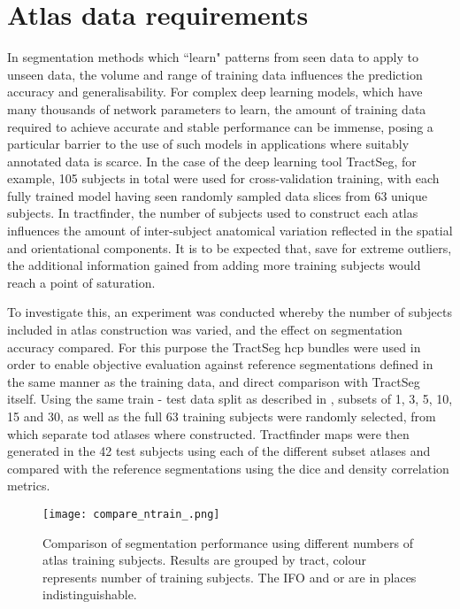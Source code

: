 \section{Atlas data requirements}\label{sec:ntrain}

In segmentation methods which ``learn" patterns from seen data to apply to unseen data, the volume and range of training data influences the prediction accuracy and generalisability.
For complex deep learning models, which have many thousands of network parameters to learn, the amount of training data required to achieve accurate and stable performance can be immense, posing a particular barrier to the use of such models in applications where suitably annotated data is scarce.
In the case of the deep learning tool TractSeg\autocite{Wasserthal2018}, for example, 105 subjects in total were used for cross-validation training, with each fully trained model having seen randomly sampled data slices from 63 unique subjects.
In tractfinder, the number of subjects used to construct each atlas influences the amount of inter-subject anatomical variation reflected in the spatial and orientational components.
It is to be expected that, save for extreme outliers, the additional information gained from adding more training subjects would reach a point of saturation.

To investigate this, an experiment was conducted whereby the number of subjects included in atlas construction was varied, and the effect on segmentation accuracy compared.
For this purpose the TractSeg \gls{hcp} bundles were used in order to enable objective evaluation against reference segmentations defined in the same manner as the training data, and direct comparison with TractSeg itself.
Using the same train - test data split as described in \textcite{Wasserthal2018b}, subsets of 1, 3, 5, 10, 15 and 30, as well as the full 63 training subjects were randomly selected, from which separate \gls{tod} atlases where constructed.
Tractfinder maps were then generated in the 42 test subjects using each of the different subset atlases and compared with the reference segmentations using the \gls{dice} and density correlation metrics.

\begin{figure}[hb!]
    \centering
    \texttt{[image: compare\_ntrain\_.png]}
    \caption{Comparison of segmentation performance using different numbers of atlas training subjects. Results are grouped by tract, colour represents number of training subjects. The IFO and \gls{or} are in places indistinguishable. }
    \label{fig:ntrain}
\end{figure}

